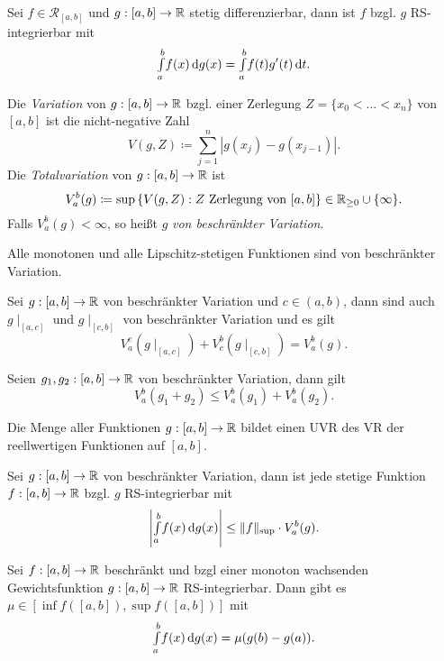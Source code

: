 \documentclass{cheat-sheet}
\begin{document}
\begin{satz}
Sei $f \in \mathcal{R}_{[a, b]}$ und $g : [a, b] \to \mathbb{R}$ stetig differenzierbar, dann ist $f$ bzgl. $g$ RS-integrierbar mit
\[ {\textstyle \int\limits_{a}^{b}} f(x) \,\mathrm{d} g(x) = {\textstyle \int\limits_{a}^{b}} f(t)g'(t) \,\mathrm{d} t. \]
\end{satz}

\begin{defn}
Die \emph{Variation} von $g : [a, b] \to \mathbb{R}$ bzgl. einer Zerlegung $Z = \{ x_0 < ... < x_n \}$ von $[a, b]$ ist die nicht-negative Zahl
\[ V(g, Z) \coloneqq \sum_{j=1}^{n} |g(x_j) - g(x_{j-1})|. \]
Die \emph{Totalvariation} von $g : [a, b] \to \mathbb{R}$ ist
\[ V_a^b(g) \coloneqq \sup\left\{ V(g, Z) : Z \text{ Zerlegung von } [a, b] \right\} \in \mathbb{R}_{\ge 0} \cup \{ \infty \}. \]
Falls $V_a^b(g) < \infty$, so heißt $g$ \emph{von beschränkter Variation}.
\end{defn}

\begin{satz}
Alle monotonen und alle Lipschitz-stetigen Funktionen sind von beschränkter Variation.
\end{satz}

\begin{satz}
Sei $g : [a, b] \to \mathbb{R}$ von beschränkter Variation und $c \in (a, b)$, dann sind auch $g\mid_{[a, c]}$ und $g\mid_{[c, b]}$ von beschränkter Variation und es gilt
\[ V_a^c(g\mid_{[a, c]}) + V_c^b(g\mid_{[c, b]}) = V_a^b(g). \]
\end{satz}

\begin{satz}
Seien $g_1, g_2 : [a, b] \to \mathbb{R}$ von beschränkter Variation, dann gilt
\[ V_a^b(g_1 + g_2) \le V_a^b(g_1) + V_a^b(g_2). \]
\end{satz}

\begin{satz}
Die Menge aller Funktionen $g : [a, b] \to \mathbb{R}$ bildet einen UVR des VR der reellwertigen Funktionen auf $[a, b]$.
\end{satz}

\begin{satz}
Sei $g : [a, b] \to \mathbb{R}$ von beschränkter Variation, dann ist jede stetige Funktion $f : [a, b] \to \mathbb{R}$ bzgl. $g$ RS-integrierbar mit
\[ \left| {\textstyle \int\limits_{a}^{b}} f(x) \,\mathrm{d} g(x) \right| \le \| f \|_{\sup} \cdot V_a^b(g). \]
\end{satz}

\begin{satz}
Sei $f : [a, b] \to \mathbb{R}$ beschränkt und bzgl einer monoton wachsenden Gewichtsfunktion $g : [a, b] \to \mathbb{R}$ RS-integrierbar. Dann gibt es $\mu \in [\inf f([a, b]), \sup f([a, b])]$ mit
\[ {\textstyle \int\limits_{a}^{b}} f(x) \,\mathrm{d} g(x) = \mu(g(b) - g(a)). \]
\end{satz}
\end{document}
